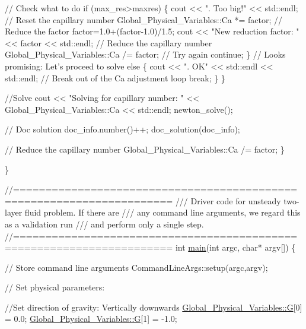 \begin{DoxyCodeInclude}
{{{     \textcolor{comment}{// Check what to do }
     \textcolor{keywordflow}{if} (max\_res>maxres)
      \{
       cout << \textcolor{stringliteral}{". Too big!"} << std::endl;
       \textcolor{comment}{// Reset the capillary number}
       Global\_Physical\_Variables::Ca *= factor;       
       \textcolor{comment}{// Reduce the factor}
       factor=1.0+(factor-1.0)/1.5;
       cout << \textcolor{stringliteral}{"New reduction factor: "} << factor << std::endl;
       \textcolor{comment}{// Reduce the capillary number}
       Global\_Physical\_Variables::Ca /= factor;
       \textcolor{comment}{// Try again}
       \textcolor{keywordflow}{continue};
      \}
     \textcolor{comment}{// Looks promising: Let's proceed to solve}
     \textcolor{keywordflow}{else}
      \{
       cout << \textcolor{stringliteral}{". OK"} << std::endl << std::endl;
       \textcolor{comment}{// Break out of the Ca adjustment loop}
       \textcolor{keywordflow}{break};
      \}
    \}

   \textcolor{comment}{//Solve}
   cout << \textcolor{stringliteral}{"Solving for capillary number: "} 
        << Global\_Physical\_Variables::Ca << std::endl;
   newton\_solve();

   \textcolor{comment}{// Doc solution}
   doc\_info.number()++;
   doc\_solution(doc\_info);
   
   \textcolor{comment}{// Reduce the capillary number}
   Global\_Physical\_Variables::Ca /= factor;
  \}

\}



\textcolor{comment}{//======================================================================}\textcolor{comment}{}
\textcolor{comment}{/// Driver code for unsteady two-layer fluid problem. If there are}
\textcolor{comment}{/// any command line arguments, we regard this as a validation run}
\textcolor{comment}{/// and perform only a single step.}
\textcolor{comment}{}\textcolor{comment}{//======================================================================}
\textcolor{keywordtype}{int} \hyperlink{bretherton_8cc_a0ddf1224851353fc92bfbff6f499fa97}{main}(\textcolor{keywordtype}{int} argc, \textcolor{keywordtype}{char}* argv[]) 
\{


 \textcolor{comment}{// Store command line arguments}
 CommandLineArgs::setup(argc,argv);

 \textcolor{comment}{// Set physical parameters:}

 \textcolor{comment}{//Set direction of gravity: Vertically downwards}
 \hyperlink{namespaceGlobal__Physical__Variables_a18fe245262ec8beec764c805bb93e73c}{Global\_Physical\_Variables::G}[0] = 0.0;
 \hyperlink{namespaceGlobal__Physical__Variables_a18fe245262ec8beec764c805bb93e73c}{Global\_Physical\_Variables::G}[1] = -1.0;

}}}
\end{DoxyCodeInclude}
